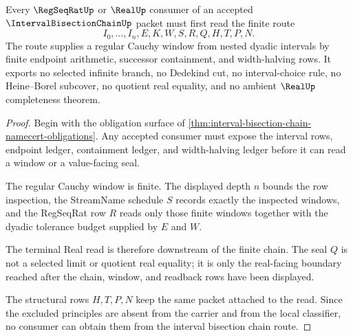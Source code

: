 \begin{theorem}
\label{thm:interval-bisection-chain-regular-cauchy-window}
Every $\RegSeqRatUp$ or $\RealUp$ consumer of an accepted $\IntervalBisectionChainUp$ packet must first read the finite route
$$
I_0,\ldots,I_n,E,K,W,S,R,Q,H,T,P,N .
$$
The route supplies a regular Cauchy window from nested dyadic intervals by finite endpoint arithmetic, successor containment, and width-halving rows. It exports no selected infinite branch, no Dedekind cut, no interval-choice rule, no Heine--Borel subcover, no quotient real equality, and no ambient $\RealUp$ completeness theorem.
\end{theorem}
\begin{proof}
Begin with the obligation surface of \autoref{thm:interval-bisection-chain-namecert-obligations}. Any accepted consumer must expose the interval rows, endpoint ledger, containment ledger, and width-halving ledger before it can read a window or a value-facing seal.

The regular Cauchy window is finite. The displayed depth $n$ bounds the row inspection, the StreamName schedule $S$ records exactly the inspected windows, and the RegSeqRat row $R$ reads only those finite windows together with the dyadic tolerance budget supplied by $E$ and $W$.

The terminal Real read is therefore downstream of the finite chain. The seal $Q$ is not a selected limit or quotient real equality; it is only the real-facing boundary reached after the chain, window, and readback rows have been displayed.

The structural rows $H,T,P,N$ keep the same packet attached to the read. Since the excluded principles are absent from the carrier and from the local classifier, no consumer can obtain them from the interval bisection chain route.
\end{proof}


